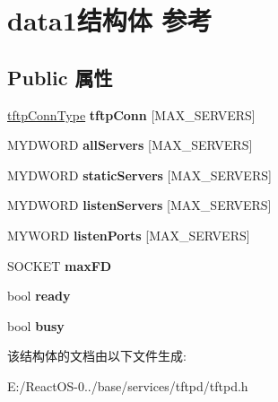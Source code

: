 \hypertarget{structdata1}{}\section{data1结构体 参考}
\label{structdata1}
\subsection*{Public 属性}
\begin{DoxyCompactItemize}
\item 
\mbox{\label{structdata1_a83b45a7775cd5f4f43591397a8c00b5a}} 
\hyperlink{structtftp_conn_type}{tftp\+Conn\+Type} {\bfseries tftp\+Conn} \mbox{[}M\+A\+X\+\_\+\+S\+E\+R\+V\+E\+RS\mbox{]}
\item 
\mbox{\label{structdata1_a8b42175b2220b5648ae37526a9549167}} 
M\+Y\+D\+W\+O\+RD {\bfseries all\+Servers} \mbox{[}M\+A\+X\+\_\+\+S\+E\+R\+V\+E\+RS\mbox{]}
\item 
\mbox{\label{structdata1_a08d33ad854fdbaaedaf5cb215867a516}} 
M\+Y\+D\+W\+O\+RD {\bfseries static\+Servers} \mbox{[}M\+A\+X\+\_\+\+S\+E\+R\+V\+E\+RS\mbox{]}
\item 
\mbox{\label{structdata1_acd1ea168cb094e82c894c97899a2c312}} 
M\+Y\+D\+W\+O\+RD {\bfseries listen\+Servers} \mbox{[}M\+A\+X\+\_\+\+S\+E\+R\+V\+E\+RS\mbox{]}
\item 
\mbox{\label{structdata1_af02ceb29ca24dabddd17216f36e0f78a}} 
M\+Y\+W\+O\+RD {\bfseries listen\+Ports} \mbox{[}M\+A\+X\+\_\+\+S\+E\+R\+V\+E\+RS\mbox{]}
\item 
\mbox{\label{structdata1_a55c777234c0d579203d3efb0a7631175}} 
S\+O\+C\+K\+ET {\bfseries max\+FD}
\item 
\mbox{\label{structdata1_af56ab5fddf851e746ebc6e87520e04be}} 
bool {\bfseries ready}
\item 
\mbox{\label{structdata1_a4303c37be2e95df51e900a9b6c68a59c}} 
bool {\bfseries busy}
\end{DoxyCompactItemize}


该结构体的文档由以下文件生成\+:\begin{DoxyCompactItemize}
\item 
E\+:/\+React\+O\+S-\/0../base/services/tftpd/tftpd.\+h\end{DoxyCompactItemize}
